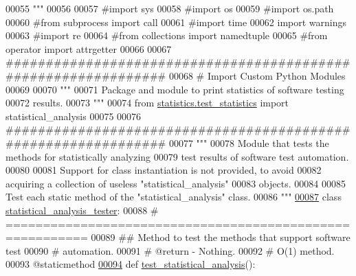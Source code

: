 \begin{DoxyCode}
00055 \textcolor{stringliteral}{"""}
00056 
00057 \textcolor{comment}{#import sys}
00058 \textcolor{comment}{#import os}
00059 \textcolor{comment}{#import os.path}
00060 \textcolor{comment}{#from subprocess import call}
00061 \textcolor{comment}{#import time}
00062 \textcolor{keyword}{import} warnings
00063 \textcolor{comment}{#import re}
00064 \textcolor{comment}{#from collections import namedtuple}
00065 \textcolor{comment}{#from operator import attrgetter}
00066 
00067 \textcolor{comment}{###############################################################}
00068 \textcolor{comment}{#   Import Custom Python Modules}
00069 
00070 \textcolor{stringliteral}{"""}
00071 \textcolor{stringliteral}{    Package and module to print statistics of software testing}
00072 \textcolor{stringliteral}{        results.}
00073 \textcolor{stringliteral}{"""}
00074 \textcolor{keyword}{from} \hyperlink{namespacestatistics_1_1test__statistics}{statistics.test\_statistics} \textcolor{keyword}{import} statistical\_analysis
00075 
00076 \textcolor{comment}{###############################################################}
00077 \textcolor{stringliteral}{"""}
00078 \textcolor{stringliteral}{    Module that tests the methods for statistically analyzing}
00079 \textcolor{stringliteral}{        test results of software test automation.}
00080 \textcolor{stringliteral}{}
00081 \textcolor{stringliteral}{    Support for class instantiation is not provided, to avoid}
00082 \textcolor{stringliteral}{        acquiring a collection of useless "statistical\_analysis"}
00083 \textcolor{stringliteral}{        objects.}
00084 \textcolor{stringliteral}{}
00085 \textcolor{stringliteral}{    Test each static method of the "statistical\_analysis" class.}
00086 \textcolor{stringliteral}{"""}
\hypertarget{test__statistics__tester_8py_source_l00087}{}\hyperlink{classstatistics_1_1test__statistics__tester_1_1statistical__analysis__tester}{00087} \textcolor{keyword}{class }\hyperlink{classstatistics_1_1test__statistics__tester_1_1statistical__analysis__tester}{statistical\_analysis\_tester}:
00088     \textcolor{comment}{# =========================================================}
00089     \textcolor{comment}{##  Method to test the methods that support software test}
00090     \textcolor{comment}{#       automation.}
00091     \textcolor{comment}{#   @return - Nothing.}
00092     \textcolor{comment}{#   O(1) method.}
00093     @staticmethod
\hypertarget{test__statistics__tester_8py_source_l00094}{}\hyperlink{classstatistics_1_1test__statistics__tester_1_1statistical__analysis__tester_ad05a0d6e83aaba083bfba6212ec0b971}{00094}     \textcolor{keyword}{def }\hyperlink{classstatistics_1_1test__statistics__tester_1_1statistical__analysis__tester_ad05a0d6e83aaba083bfba6212ec0b971}{test\_statistical\_analysis}():

\end{DoxyCode}
